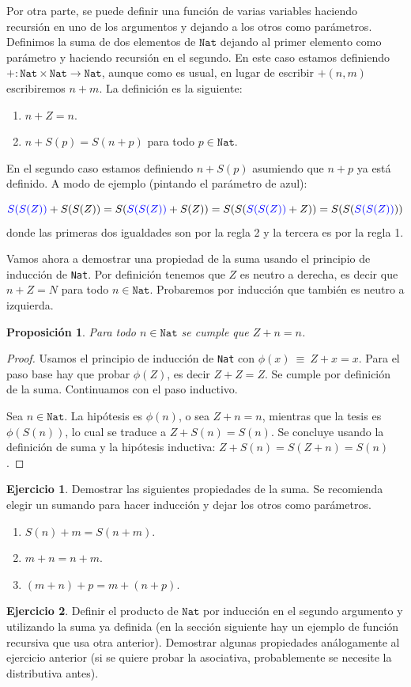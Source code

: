 \documentclass[a4paper, 12pt]{report}
\newtheorem*{prop*}{Proposición}
\theoremstyle{definition}
\newtheorem{ejercicio}{Ejercicio}[section]
\begin{document}
Por otra parte, se puede definir una función de varias variables haciendo recursión en uno de los argumentos y dejando a los otros como parámetros. Definimos la suma de dos elementos de $\mathtt{Nat}$ dejando al primer elemento como parámetro y haciendo recursión en el segundo. En este caso estamos definiendo $+:\mathtt{Nat}\times\mathtt{Nat}\to\mathtt{Nat}$, aunque como es usual, en lugar de escribir $+(n,m)$ escribiremos $n+m$. La definición es la siguiente:
\begin{enumerate}
	\item $n + Z = n$.
	\item $n + S(p) = S(n+p)$ para todo $p\in\mathtt{Nat}$.
\end{enumerate}
En el segundo caso estamos definiendo $n+S(p)$ asumiendo que $n+p$ ya está definido. A modo de ejemplo (pintando el parámetro de azul):

$$ \textcolor{blue}{S(S(Z))} + S(S(Z)) = S(\textcolor{blue}{S(S(Z))} + S(Z)) = S(S(\textcolor{blue}{S(S(Z))} + Z)) = S(S(\textcolor{blue}{S(S(Z))}))
$$
donde las primeras dos igualdades son por la regla 2 y la tercera es por la regla 1.

Vamos ahora a demostrar una propiedad de la suma usando el principio de inducción de \texttt{Nat}. Por definición tenemos que $Z$ es neutro a derecha, es decir que $n+Z=N$ para todo $n\in\mathtt{Nat}$. Probaremos por inducción que también es neutro a izquierda.

\begin{prop*}
	Para todo $n\in\mathtt{Nat}$ se cumple que $Z+n=n$.
\end{prop*}
\begin{proof}
	Usamos el principio de inducción de \texttt{Nat} con $\phi(x)~\equiv~ Z+x=x$. Para el paso base hay que probar $\phi(Z)$, es decir $Z+Z=Z$. Se cumple por definición de la suma. Continuamos con el paso inductivo.
	
	Sea $n\in\mathtt{Nat}$. La hipótesis es $\phi(n)$, o sea $Z+n=n$, mientras que la tesis es $\phi(S(n))$, lo cual se traduce a $Z+S(n)=S(n)$. Se concluye usando la definición de suma y la hipótesis inductiva: $Z+S(n) = S(Z+n) = S(n)$.
\end{proof}
\begin{ejercicio}
	Demostrar las siguientes propiedades de la suma. Se recomienda elegir un sumando para hacer inducción y dejar los otros como parámetros.
	\begin{enumerate}
		\item $S(n)+m = S(n+m)$.
		\item $m+n = n+m$.
		\item $(m+n)+p = m+(n+p)$.
	\end{enumerate}
	
\end{ejercicio}
\begin{ejercicio}
	Definir el producto de $\mathtt{Nat}$ por inducción en el segundo argumento y utilizando la suma ya definida (en la sección siguiente hay un ejemplo de función recursiva que usa otra anterior). Demostrar algunas propiedades análogamente al ejercicio anterior (si se quiere probar la asociativa, probablemente se necesite la distributiva antes).
\end{ejercicio}
\end{document}
